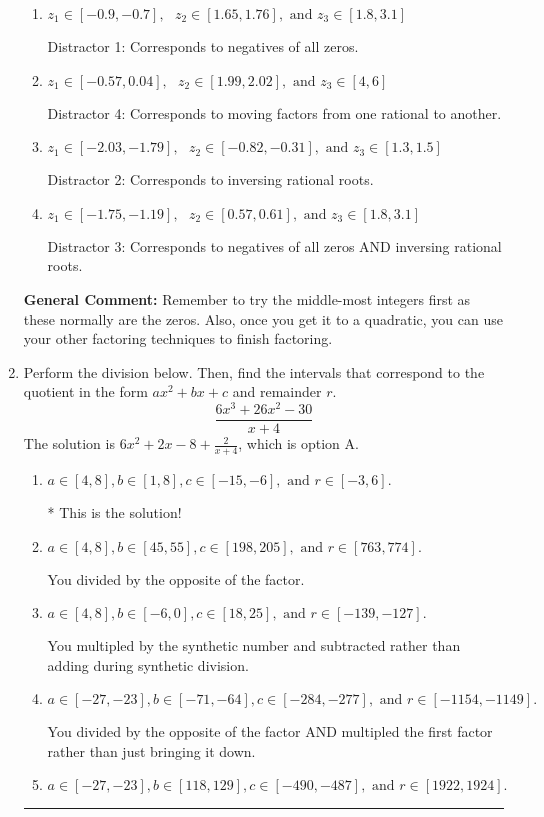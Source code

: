 \documentclass{extbook}[14pt]
\newcommand{\litem}[1]{\item #1

\rule{\textwidth}{0.4pt}}
\begin{document}
\begin{enumerate}
{\begin{enumerate}[label=\Alph*.]
* This is the solution!
\item \( z_1 \in [-0.9, -0.7], \text{   }  z_2 \in [1.65, 1.76], \text{   and   } z_3 \in [1.8, 3.1] \)

 Distractor 1: Corresponds to negatives of all zeros.
\item \( z_1 \in [-0.57, 0.04], \text{   }  z_2 \in [1.99, 2.02], \text{   and   } z_3 \in [4, 6] \)

 Distractor 4: Corresponds to moving factors from one rational to another.
\item \( z_1 \in [-2.03, -1.79], \text{   }  z_2 \in [-0.82, -0.31], \text{   and   } z_3 \in [1.3, 1.5] \)

 Distractor 2: Corresponds to inversing rational roots.
\item \( z_1 \in [-1.75, -1.19], \text{   }  z_2 \in [0.57, 0.61], \text{   and   } z_3 \in [1.8, 3.1] \)

 Distractor 3: Corresponds to negatives of all zeros AND inversing rational roots.
\end{enumerate}

\textbf{General Comment:} Remember to try the middle-most integers first as these normally are the zeros. Also, once you get it to a quadratic, you can use your other factoring techniques to finish factoring.
}
\litem{
Perform the division below. Then, find the intervals that correspond to the quotient in the form $ax^2+bx+c$ and remainder $r$.
\[ \frac{6x^{3} +26 x^{2} -30}{x + 4} \]The solution is \( 6x^{2} +2 x -8 + \frac{2}{x + 4} \), which is option A.\begin{enumerate}[label=\Alph*.]
\item \( a \in [4, 8], b \in [1, 8], c \in [-15, -6], \text{ and } r \in [-3, 6]. \)

* This is the solution!
\item \( a \in [4, 8], b \in [45, 55], c \in [198, 205], \text{ and } r \in [763, 774]. \)

 You divided by the opposite of the factor.
\item \( a \in [4, 8], b \in [-6, 0], c \in [18, 25], \text{ and } r \in [-139, -127]. \)

 You multipled by the synthetic number and subtracted rather than adding during synthetic division.
\item \( a \in [-27, -23], b \in [-71, -64], c \in [-284, -277], \text{ and } r \in [-1154, -1149]. \)

 You divided by the opposite of the factor AND multipled the first factor rather than just bringing it down.
\item \( a \in [-27, -23], b \in [118, 129], c \in [-490, -487], \text{ and } r \in [1922, 1924]. \)


\end{enumerate}}
\end{enumerate}
\end{document}
